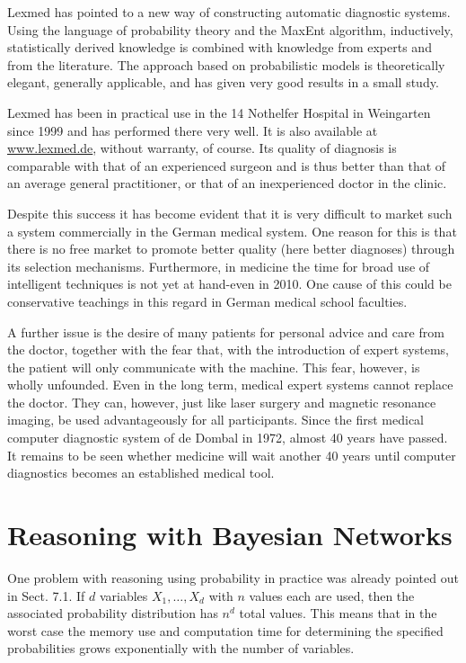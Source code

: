 \documentclass[10pt]{book}
\begin{document}
Lexmed has pointed to a new way of constructing automatic diagnostic systems. Using the language of probability theory and the MaxEnt algorithm, inductively,\\
statistically derived knowledge is combined with knowledge from experts and from the literature. The approach based on probabilistic models is theoretically elegant, generally applicable, and has given very good results in a small study.

Lexmed has been in practical use in the 14 Nothelfer Hospital in Weingarten since 1999 and has performed there very well. It is also available at \href{http://www.lexmed.de}{www.lexmed.de}, without warranty, of course. Its quality of diagnosis is comparable with that of an experienced surgeon and is thus better than that of an average general practitioner, or that of an inexperienced doctor in the clinic.

Despite this success it has become evident that it is very difficult to market such a system commercially in the German medical system. One reason for this is that there is no free market to promote better quality (here better diagnoses) through its selection mechanisms. Furthermore, in medicine the time for broad use of intelligent techniques is not yet at hand-even in 2010. One cause of this could be conservative teachings in this regard in German medical school faculties.

A further issue is the desire of many patients for personal advice and care from the doctor, together with the fear that, with the introduction of expert systems, the patient will only communicate with the machine. This fear, however, is wholly unfounded. Even in the long term, medical expert systems cannot replace the doctor. They can, however, just like laser surgery and magnetic resonance imaging, be used advantageously for all participants. Since the first medical computer diagnostic system of de Dombal in 1972, almost 40 years have passed. It remains to be seen whether medicine will wait another 40 years until computer diagnostics becomes an established medical tool.

\section{Reasoning with Bayesian Networks}
One problem with reasoning using probability in practice was already pointed out in Sect. 7.1. If $d$ variables $X_{1}, \ldots, X_{d}$ with $n$ values each are used, then the associated probability distribution has $n^{d}$ total values. This means that in the worst case the memory use and computation time for determining the specified probabilities grows exponentially with the number of variables.
\end{document}
